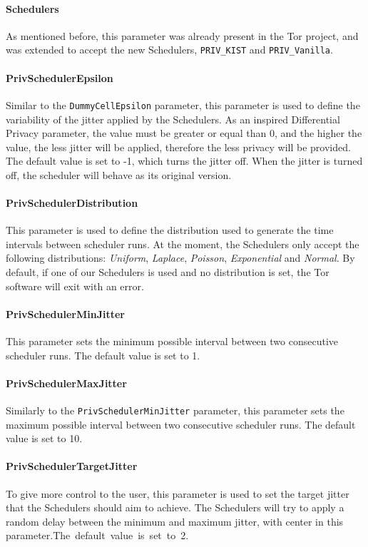 \paragraph{Schedulers} As mentioned before, this parameter was already present in the Tor project, and was extended to accept the new Schedulers, \texttt{PRIV\_KIST} and \texttt{PRIV\_Vanilla}. 

\paragraph{PrivSchedulerEpsilon} Similar to the \texttt{DummyCellEpsilon} parameter, this parameter is used to define the variability of the jitter applied by the Schedulers. As an inspired Differential Privacy parameter, the value must be greater or equal than 0, and the higher the value, the less jitter will be applied, therefore the less privacy will be provided. The default value is set to -1, which turns the jitter off. When the jitter is turned off, the scheduler will behave as its original version.  

\paragraph{PrivSchedulerDistribution} This parameter is used to define the distribution used to generate the time intervals between scheduler runs. At the moment, the Schedulers only accept the following distributions: \textit{Uniform}, \textit{Laplace}, \textit{Poisson}, \textit{Exponential} and \textit{Normal}. By default, if one of our Schedulers is used and no distribution is set, the Tor software will exit with an error.

\paragraph{PrivSchedulerMinJitter} This parameter sets the minimum possible interval between two consecutive scheduler runs. The default value is set to 1.

\paragraph{PrivSchedulerMaxJitter} Similarly to the \texttt{PrivSchedulerMinJitter} parameter, this parameter sets the maximum possible interval between two consecutive scheduler runs. The default value is set to 10. 

\paragraph{PrivSchedulerTargetJitter} To give more control to the user, this parameter is used to set the target jitter that the Schedulers should aim to achieve. The Schedulers will try to apply a random delay between the minimum and maximum jitter, with center in this parameter.\mbox{The default value is set to 2.}

